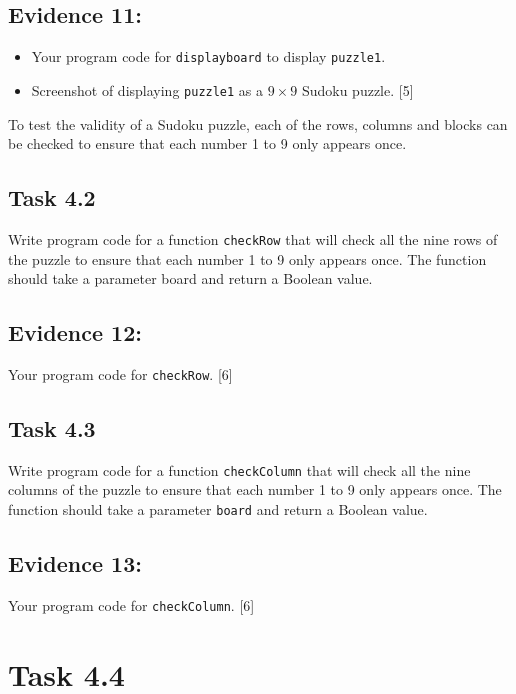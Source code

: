 \subsection*{Evidence 11: }
\begin{itemize}
\item Your program code for \texttt{displayboard} to display \texttt{puzzle1}. 
\item Screenshot of displaying \texttt{puzzle1} as a $9\times9$ Sudoku
puzzle.\hfill{} {[}5{]} 
\end{itemize}
To test the validity of a Sudoku puzzle, each of the rows, columns
and blocks can be checked to ensure that each number 1 to 9 only appears
once. 

\subsection*{Task 4.2 }

Write program code for a function \texttt{checkRow} that will check
all the nine rows of the puzzle to ensure that each number 1 to 9
only appears once. The function should take a parameter board and
return a Boolean value. 

\subsection*{Evidence 12: }

Your program code for \texttt{checkRow}.\hfill{} {[}6{]}

\subsection*{Task 4.3}

Write program code for a function \texttt{checkColumn} that will check
all the nine columns of the puzzle to ensure that each number 1 to
9 only appears once. The function should take a parameter \texttt{board}
and return a Boolean value.

\subsection*{Evidence 13: }

Your program code for \texttt{checkColumn}. \hfill{}{[}6{]}

\section*{Task 4.4 }

